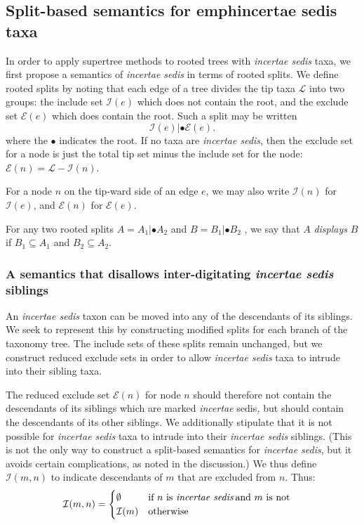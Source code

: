 \documentclass[english]{article}
\begin{document}
\subsection{Split-based semantics for emph{incertae sedis} taxa}

In order to apply supertree methods to rooted trees with
\emph{incertae sedis} taxa, we first propose a semantics of
\emph{incertae sedis }in terms of rooted splits. We define rooted
splits by noting that each edge of a tree divides the tip taxa
$\mathcal{L}$ into two groups: the include set $\mathcal{I}(e)$ which
does not contain the root, and the exclude set $\mathcal{E}(e)$ which
does contain the root. Such a split may be written \[
\mathcal{I}(e)|\bullet\mathcal{E}(e). \] where the $\bullet$ indicates
the root. If no taxa are \emph{incertae sedis}, then the exclude set
for a node is just the total tip set minus the include set for the
node: $ \mathcal{E}(n) =\mathcal{L}-\mathcal{I}(n)$.


For a node $n$ on the tip-ward side of an edge $e$, we may also write
$\mathcal{I}(n)$ for $\mathcal{I}(e)$, and $\mathcal{E}(n)$ for
$\mathcal{E}(e)$.

For any two rooted splits $A=A_{1}|\bullet A_{2}$ and $B=B_{1}|\bullet
B_{2}$ , we say that $A$ \emph{displays }$B$ if $B_{1}\subseteq A_{1}$
and $B_{2}\subseteq A_{2}$.

\subsubsection{A semantics that disallows inter-digitating
\emph{incertae sedis} siblings}

An \emph{incertae sedis} taxon can be moved into any of the
descendants of its siblings. We seek to represent this by constructing
modified splits for each branch of the taxonomy tree. The include sets
of these splits remain unchanged, but we construct reduced exclude
sets in order to allow \emph{incertae sedis} taxa to intrude into
their sibling taxa.

The reduced exclude set $\mathcal{E}(n)$ for node $n$ should therefore
not contain the descendants of its siblings which are marked
\emph{incertae }sedis\emph{,} but should contain the descendants of
its other siblings\emph{. }We additionally stipulate that it is not
possible for \emph{incertae sedis} taxa to intrude into their
\emph{incertae sedis} siblings. (This is not the only way to construct
a split-based semantics for \emph{incertae sedis}, but it avoids
certain complications, as noted in the discussion.) We thus define
$\mathcal{I}(m,n)$ to indicate descendants of $m$ that are excluded
from $n$. Thus:
\begin{align*}
\mathcal{I}(m,n) & =
    \begin{cases}
        \emptyset & \text{if }n\text{ is \emph{incertae sedis}\,and }m\text{
is not}\\
        \mathcal{I}(m) & \text{otherwise}
    \end{cases}
\end{align*}
\end{document}
